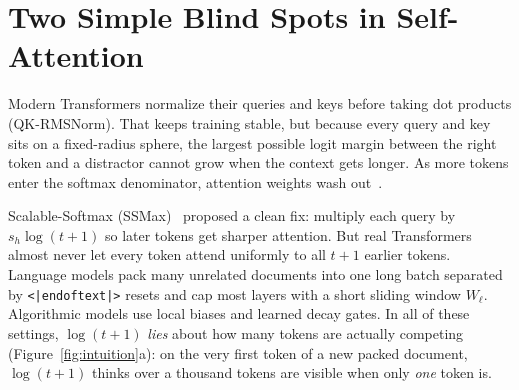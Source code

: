 \documentclass[10pt]{article}
\begin{document}
\begin{abstract}
Opening the learned models reveals crisp, human-readable circuits in both small algorithmic Transformers and a $124\text{M}$ LLM:
(i)~On addition trained only on $1,2,3,5$-digit numbers, all $9/9$ seeds spontaneously discover hardware \emph{carry-lookahead walls} (transparent on $a_k+b_k=9$, opaque walls on $<9$ and $>9$), lifting $25$-digit ($5\times$) accuracy by $+59\text{pp}$, extrapolating up to $81.2\%$ at $200$ digits ($40\times$), and collapsing from $97.7\% \to 0.0\%$ when only those walls are zeroed.
(ii)~On multi-step symbolic algebra with zero digit formulas, general causal versions yield $3.7\times$ exact match on $2\times$ longer traces ($+17.2\text{pp}$ token accuracy, $p=0.0033$).
(iii)~On the $124\text{M}$ \texttt{modded-nanogpt} speedrun, Mask-Aware SSMax adds just $+42$ scalars fused into QK-RMSNorm+RoPE with zero extra HBM passes ($+72\text{ ms}$, $+0\text{ MiB}$ VRAM): $250/252$ heads learn positive slopes with long-window layers learning $2.5\times$ steeper curves, run-to-run loss variance drops $3.5\text{--}4.9\times$, and an official interleaved $10\text{ vs.\ }10$ certification on $8\times\text{H100 SXM5}$ cuts training time by $-0.477\text{ s}$ ($40.45\text{ s} \to \mathbf{39.98\text{ s}}$, $p=7.6\times 10^{-12}$) while clearing the $3.28$ validation gate on $10/10$ runs ($p=1.26\times 10^{-6}$), whereas cutting steps without SSMax fails the gate ($p=0.496$).
\end{abstract}

\section{Two Simple Blind Spots in Self-Attention}
\label{sec:intro}

Modern Transformers normalize their queries and keys before taking dot products (QK-RMSNorm). That keeps training stable, but because every query and key sits on a fixed-radius sphere, the largest possible logit margin between the right token and a distractor cannot grow when the context gets longer. As more tokens enter the softmax denominator, attention weights wash out~\cite{chiang2022,velickovic2025}.

Scalable-Softmax (SSMax)~\cite{nakanishi2025} proposed a clean fix: multiply each query by $s_h \log(t+1)$ so later tokens get sharper attention. But real Transformers almost never let every token attend uniformly to all $t+1$ earlier tokens. Language models pack many unrelated documents into one long batch separated by \texttt{<|endoftext|>} resets and cap most layers with a short sliding window $W_\ell$. Algorithmic models use local biases and learned decay gates. In all of these settings, $\log(t+1)$ \emph{lies} about how many tokens are actually competing (Figure~\ref{fig:intuition}a): on the very first token of a new packed document, $\log(t+1)$ thinks over a thousand tokens are visible when only \emph{one} token is.
\end{document}
